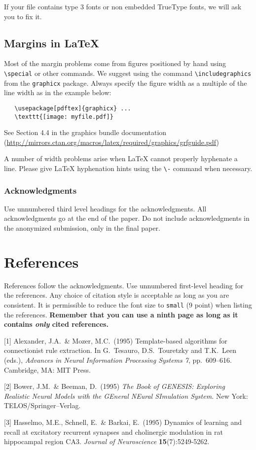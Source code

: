 \documentclass{article}
\begin{document}
If your file contains type 3 fonts or non embedded TrueType fonts, we
will ask you to fix it.

\subsection{Margins in \LaTeX{}}

Most of the margin problems come from figures positioned by hand using
\verb+\special+ or other commands. We suggest using the command
\verb+\includegraphics+ from the \verb+graphicx+ package. Always
specify the figure width as a multiple of the line width as in the
example below:
\begin{verbatim}
   \usepackage[pdftex]{graphicx} ...
   \texttt{[image: myfile.pdf]}
\end{verbatim}
See Section 4.4 in the graphics bundle documentation
(\url{http://mirrors.ctan.org/macros/latex/required/graphics/grfguide.pdf})

A number of width problems arise when \LaTeX{} cannot properly
hyphenate a line. Please give LaTeX hyphenation hints using the
\verb+\-+ command when necessary.

\subsubsection*{Acknowledgments}

Use unnumbered third level headings for the acknowledgments. All
acknowledgments go at the end of the paper. Do not include
acknowledgments in the anonymized submission, only in the final paper.

\section*{References}

References follow the acknowledgments. Use unnumbered first-level
heading for the references. Any choice of citation style is acceptable
as long as you are consistent. It is permissible to reduce the font
size to \verb+small+ (9 point) when listing the references. {\bf
  Remember that you can use a ninth page as long as it contains
  \emph{only} cited references.}
\medskip

\small

[1] Alexander, J.A.\ \& Mozer, M.C.\ (1995) Template-based algorithms
for connectionist rule extraction. In G.\ Tesauro, D.S.\ Touretzky and
T.K.\ Leen (eds.), {\it Advances in Neural Information Processing
  Systems 7}, pp.\ 609--616. Cambridge, MA: MIT Press.

[2] Bower, J.M.\ \& Beeman, D.\ (1995) {\it The Book of GENESIS:
  Exploring Realistic Neural Models with the GEneral NEural SImulation
  System.}  New York: TELOS/Springer--Verlag.

[3] Hasselmo, M.E., Schnell, E.\ \& Barkai, E.\ (1995) Dynamics of
learning and recall at excitatory recurrent synapses and cholinergic
modulation in rat hippocampal region CA3. {\it Journal of
  Neuroscience} {\bf 15}(7):5249-5262.
\end{document}
